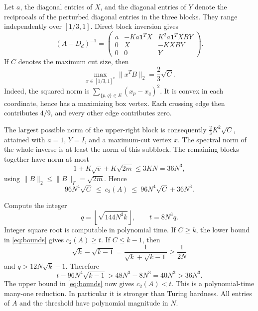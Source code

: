 \documentclass[11pt,a4paper]{article}
\theoremstyle{remark}\newtheorem{remark}[theorem]{Remark}
\newcommand{\one}{\mathbf 1}
\begin{document}
Let $a$, the diagonal entries of $X$, and the diagonal entries of $Y$ denote the reciprocals of the perturbed diagonal entries in the three blocks. They range independently over $[1/3,1]$. Direct block inversion gives
\[
 (A-D_d)^{-1}=
 \begin{pmatrix}
 a&-Ka\one^TX&K^2a\one^TXBY\\
 0&X&-KXBY\\
 0&0&Y
 \end{pmatrix}.
\]
If $C$ denotes the maximum cut size, then
\begin{equation}\label{eq:cut}
 \max_{x\in[1/3,1]^v}\|x^TB\|_2=\frac23\sqrt C.
\end{equation}
Indeed, the squared norm is $\sum_{\{p,q\}\in E}(x_p-x_q)^2$. It is convex in each coordinate, hence has a maximizing box vertex. Each crossing edge then contributes $4/9$, and every other edge contributes zero.

The largest possible norm of the upper-right block is consequently $\frac23K^2\sqrt C$, attained with $a=1$, $Y=I$, and a maximum-cut vertex $x$. The spectral norm of the whole inverse is at least the norm of this subblock. The remaining blocks together have norm at most
\[
 1+K\sqrt v+K\sqrt{2m}\le3KN=36N^3,
\]
using $\|B\|_2\le\|B\|_F=\sqrt{2m}$. Hence
\begin{equation}\label{eq:bounds}
 96N^4\sqrt C\ \le\ c_2(A)\ \le\ 96N^4\sqrt C+36N^3.
\end{equation}

Compute the integer
\[
 q=\left\lfloor\sqrt{144N^2k}\right\rfloor,\qquad t=8N^3q.
\]
Integer square root is computable in polynomial time. If $C\ge k$, the lower bound in \eqref{eq:bounds} gives $c_2(A)\ge t$. If $C\le k-1$, then
\[
 \sqrt k-\sqrt{k-1}=\frac1{\sqrt k+\sqrt{k-1}}\ge\frac1{2N}
\]
and $q>12N\sqrt k-1$. Therefore
\[
 t-96N^4\sqrt{k-1}>48N^3-8N^3=40N^3>36N^3.
\]
The upper bound in \eqref{eq:bounds} now gives $c_2(A)<t$. This is a polynomial-time many-one reduction. In particular it is stronger than Turing hardness. All entries of $A$ and the threshold have polynomial magnitude in $N$.
\end{document}
